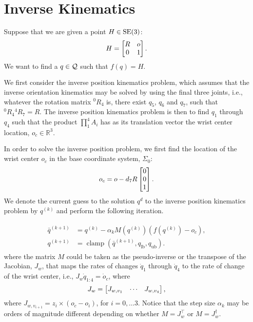 \section{Inverse Kinematics}
\label{sec:inversekin}

Suppose that we are given a point $H \in \mathrm{SE}(3)$: 
\[ H = \begin{bmatrix}R & o \\ 0 & 1\end{bmatrix}. \]
We want to find a $q \in \mathcal{Q}$ such that $f(q) = H$.

We first consider the inverse position kinematics problem, 
which assumes that the inverse orientation kinematics may be 
solved by using the final three joints, i.e., whatever the 
rotation matrix $^0R_4$ is, there exist $q_5$, $q_6$ and $q_7$, 
such that ${}^0R_4 {}^4R_7 = R$. The inverse position kinematics 
problem is then to find $q_1$ through $q_4$ such that the product $\prod_1^4
A_i$ has as its translation vector the wrist center location, $o_c \in
\mathbb{R}^3$.

In order to solve the inverse position problem, we first find the location of
the wrist center $o_c$ in the base coordinate system,
$\Sigma_0$: \[ o_c = o - d_7 R \begin{bmatrix}0 \\ 0 \\ 1\end{bmatrix}. \]
%
We denote the current guess to the solution $q^d$ to the inverse position
kinematics problem by $q^{(k)}$ and perform the following iteration.

\begin{align}
  \begin{split}
  \bar{q}^{(k+1)} &= q^{(k)} - \alpha_k M\left(q^{(k)}\right)\left(f\left(q^{(k)}\right) - o_c \right), \\
  q^{(k+1)} &= \operatorname{clamp}\left(\bar{q}^{(k+1)}, q_{\text{lb}}, q_{\text{ub}} \right).
  \end{split}
  \label{eq:ipk_iter}
\end{align}
%
where the matrix $M$ could be taken as the pseudo-inverse or the transpose of
the Jacobian, $J_w$, that maps the rates of changes $\dot{q}_1$ through
$\dot{q}_4$ to the rate of change of the wrist center, i.e., $J_w \dot{q}_{1:4}
= \dot{o}_c$, where
%
\[ J_w = \begin{bmatrix}J_{w,v_1} & \cdots & J_{w, v_4}\end{bmatrix}, \] where $J_{w,v_{i+1}} = z_i
\times (o_c - o_i)$, for $i = 0, \ldots 3$. Notice that the step size $\alpha_k$
may be orders of magnitude different depending on whether $M = J_w^\top$ or $M =
J_w^\dagger$. 
